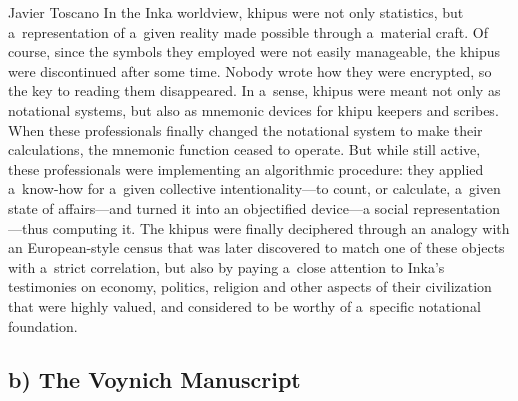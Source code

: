 \begin{artengenv}{Javier Toscano}
In the Inka worldview, khipus were not only statistics, but a~representation of a~given reality made possible through a~material craft. Of course, since the symbols they employed were not easily manageable, the khipus were discontinued after some time. Nobody wrote how they were encrypted, so the key to reading them disappeared. In a~sense, khipus were meant not only as notational systems, but also as mnemonic devices for khipu keepers and scribes. When these professionals finally changed the notational system to make their calculations, the mnemonic function ceased to operate. But while still active, these professionals were implementing an algorithmic procedure: they applied a~know-how for a~given collective intentionality---to count, or calculate, a~given state of affairs---and turned it into an objectified device---a social representation---thus computing it. The khipus were finally deciphered through an analogy with an European-style census that was later discovered to match one of these objects with a~strict correlation, but also by paying a~close attention to Inka's testimonies on economy, politics, religion and other aspects of their civilization that were highly valued, and considered to be worthy of a~specific notational foundation.

\subsection{b) The Voynich Manuscript}


\end{artengenv}
